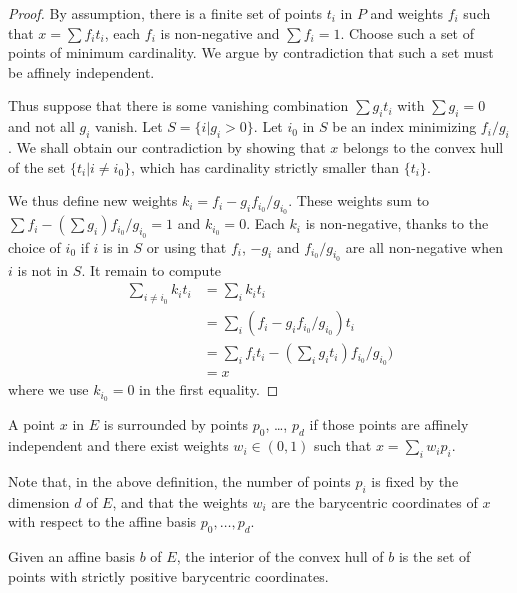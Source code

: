 \begin{proof}
  \leanok
  By assumption, there is a finite set of points $t_i$ in $P$ and
  weights $f_i$ such that $x = \sum f_i t_i$, each $f_i$ is non-negative
  and $\sum f_i = 1$.
  Choose such a set of points of minimum cardinality. We argue by
  contradiction that such a set must be affinely independent.

  Thus suppose that there is some vanishing combination $\sum g_i t_i$ with
  $\sum g_i = 0$ and not all $g_i$ vanish.
  Let $S = \{i | g_i > 0\}$.
  Let $i_0$ in $S$ be an index minimizing $f_i/g_i$. We shall obtain our
  contradiction by showing that $x$ belongs to the convex hull of the set
  $\{t_i| i \ne i_0\}$, which has cardinality strictly smaller than
  $\{t_i\}$.

  We thus define new weights $k_i = f_i - g_i f_{i_0}/g_{i_0}$.
  These weights sum to $\sum f_i - (\sum g_i)f_{i_0}/g_{i_0} = 1$
  and $k_{i_0} = 0$.
  Each $k_i$ is non-negative, thanks to the choice of $i_0$ if
  $i$ is in $S$ or using that $f_i$, $-g_i$ and $f_{i_0}/g_{i_0}$
  are all non-negative when $i$ is not in $S$.
  It remain to compute
  \begin{align*}
    \sum_{i ≠ i_0} k_i t_i &= \sum_i k_i t_i \\
      &= \sum_i (f_i - g_i f_{i_0}/g_{i_0}) t_i  \\
      &= \sum_i f_i t_i - \left(\sum_i g_i t_i\right)f_{i_0}/g_{i_0})   \\
      &= x
  \end{align*}
  where we use $k_{i_0} = 0$ in the first equality.
\end{proof}


\begin{definition}
  \label{def:surrounds_points}
  \leanok
  A point $x$ in $E$
  is surrounded by points $p_0$, \dots, $p_d$ if those points are
  affinely independent and there exist weights $w_i ∈ (0, 1)$ such
  that $x = \sum_i w_i p_i$.
\end{definition}

Note that, in the above definition, the number of points $p_i$ is fixed
by the dimension $d$ of $E$, and that the weights $w_i$ are the barycentric
coordinates of $x$ with respect to the affine basis $p_0, \ldots, p_d$.

\begin{lemma}
  \label{lem:interior_chab}
  \leanok
  Given an affine basis $b$ of $E$, the interior of the convex hull of
  $b$ is the set of points with strictly positive barycentric coordinates.
\end{lemma}

